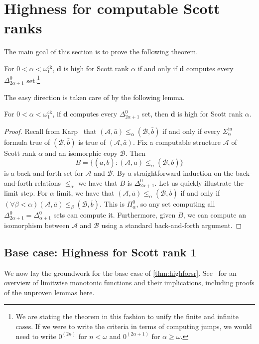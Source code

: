 \documentclass[10pt,a4paper]{amsart}
\newcommand\+[1]{\mathcal{#1}}
\renewcommand\*[1]{\mathbf{#1}}
\renewcommand\=[1]{\text{#1}}
\renewcommand\*[1]{\mathbf{#1}}
\newcommand{\A}{\mathcal{A}}
\newcommand{\B}{\mathcal{B}}
\newcommand{\Sinf}[1]{\Sigma^{\mathrm{in}}_{#1}}
\newcommand{\ock}{\omega_{1}^{\mathrm{ck}}}
\begin{document}
\section{Highness for computable Scott ranks}\label{sec:cSr}
The main goal of this section is to prove the following theorem.
\begin{theorem}\label{thm:highforsr}
For $0 < \alpha < \ock$, $\*d$ is high for Scott rank $\alpha$ if and only if $\*d$ computes every $\Delta^0_{2\alpha+1}$ set.\footnote{We are stating the theorem in this fashion to unify the finite and infinite cases.  If we were to write the criteria in terms of computing jumps, we would need to write $0^{(2n)}$ for $n < \omega$ and $0^{(2\alpha+1)}$ for $\alpha \ge \omega$.}
\end{theorem}


The easy direction is taken care of by the following lemma.
\begin{lemma}
  For $0<\alpha<\ock$, if $\*d$ computes every $\Delta^0_{2\alpha+1}$ set, then $\*d$ is high for Scott rank $\alpha$.
\end{lemma}
\begin{proof}
  Recall from Karp~\cite{karp1965b} that $(\A,\bar a)\leq_\alpha (\B,\bar b)$ if and only if every $\Sinf{\alpha}$ formula true of $(\B,\bar b)$ is true of $(\A,\bar a)$. Fix a computable structure $\A$ of Scott rank $\alpha$ and an isomorphic copy $\B$. Then 
  \[ B=\{ (\bar a,\bar b) \colon (\A, \bar a)\leq_\alpha (\B, \bar b)\}\]
  is a back-and-forth set for $\A$ and $\B$. By a straightforward induction on the back-and-forth relations $\leq_\alpha$ we have that $B$ is $\Delta_{2\alpha+1}^0$. Let us quickly illustrate the limit step. For $\alpha$ limit, we have that $(\A, \bar a)\leq_\alpha (\B, \bar b)$ if and only if $(\forall \beta<\alpha) (\A,\bar a)\leq_\beta (\B,\bar b)$. This is $\Pi^0_{\alpha}$, so any set computing all $\Delta_{2\alpha+1}^0=\Delta_{\alpha+1}^0$ sets can compute it. Furthermore, given $B$, we can compute an isomorphism between $\A$ and $\B$ using a standard back-and-forth argument.
\end{proof}
\subsection{Base case: Highness for Scott rank 1}
We now lay the groundwork for the base case of \cref{thm:highforsr}.
See~\cite{downey2011} for an overview of limitwise monotonic functions and their implications, including proofs of the unproven lemmas here. 
\end{document}
